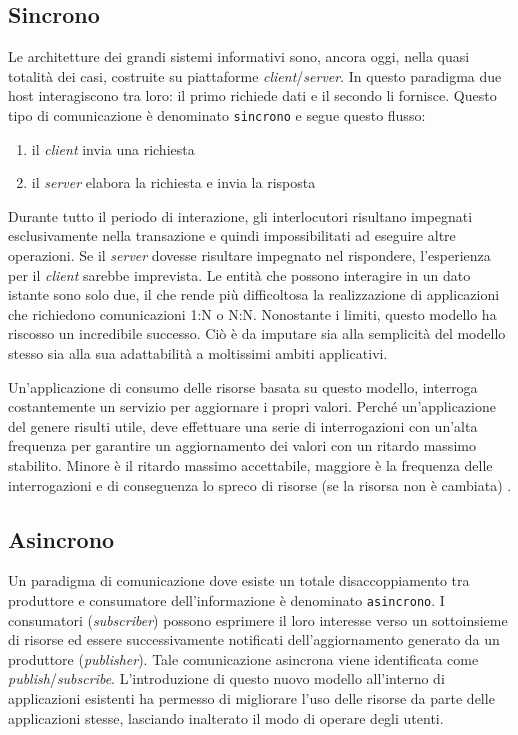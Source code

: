 \subsection{Sincrono}
\label{sub:asyncSincrono}

Le architetture dei grandi sistemi informativi sono, ancora oggi, nella quasi totalità dei casi, costruite su piattaforme \textit{client}/\textit{server}.
In questo paradigma due host interagiscono tra loro: il primo richiede dati e il secondo li fornisce.
Questo tipo di comunicazione è denominato \verb+sincrono+ e segue questo flusso:
\begin{enumerate}
  \item il \textit{client} invia una richiesta
  \item il \textit{server} elabora la richiesta e invia la risposta
\end{enumerate}
Durante tutto il periodo di interazione, gli interlocutori risultano impegnati esclusivamente nella transazione e quindi impossibilitati ad eseguire altre operazioni.
Se il \textit{server} dovesse risultare impegnato nel rispondere, l'esperienza per il \textit{client} sarebbe imprevista.
Le entità che possono interagire in un dato istante sono solo due, il che rende più difficoltosa la realizzazione di applicazioni che richiedono comunicazioni
1:N o N:N.
Nonostante i limiti, questo modello ha riscosso un incredibile successo.
Ciò è da imputare sia alla semplicità del modello stesso sia alla sua adattabilità a moltissimi ambiti applicativi.

Un'applicazione di consumo delle risorse basata su questo modello, interroga costantemente un servizio per aggiornare i propri valori.
Perché un'applicazione del genere risulti utile, deve effettuare una serie di interrogazioni con un'alta frequenza per garantire un aggiornamento dei valori con un ritardo massimo stabilito.
Minore è il ritardo massimo accettabile, maggiore è la frequenza delle interrogazioni e di conseguenza lo spreco di risorse (se la risorsa non è cambiata) \cite{PubSub}.

\subsection{Asincrono}
\label{sub:asyncAsincrono}

Un paradigma di comunicazione dove esiste un totale disaccoppiamento tra produttore e consumatore dell'informazione è denominato \verb+asincrono+.
I consumatori (\textit{subscriber}) possono esprimere il loro interesse verso un sottoinsieme di risorse ed essere successivamente notificati dell'aggiornamento generato da un produttore (\textit{publisher}).
Tale comunicazione asincrona viene identificata come \textit{publish}/\textit{subscribe}.
L'introduzione di questo nuovo modello all'interno di applicazioni esistenti ha permesso di migliorare l'uso delle risorse da parte delle applicazioni stesse, lasciando inalterato il modo di operare degli utenti.
